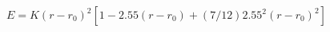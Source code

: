 \documentclass[12pt]{article}
\begin{document}
\thispagestyle{empty}
$$
  E = K (r - r_0)^2 \left[ 1 - 2.55(r-r_0) + (7/12) 2.55^2(r-r_0)^2 \right]
$$
\end{document}
